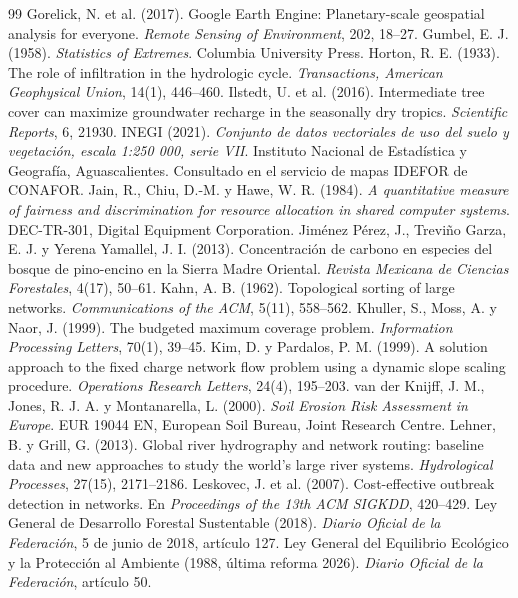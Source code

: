 \begin{thebibliography}{99}
 Gorelick, N. et al. (2017). Google Earth Engine: Planetary-scale geospatial analysis for everyone. \emph{Remote Sensing of Environment}, 202, 18–27.
 Gumbel, E. J. (1958). \emph{Statistics of Extremes}. Columbia University Press.
 Horton, R. E. (1933). The role of infiltration in the hydrologic cycle. \emph{Transactions, American Geophysical Union}, 14(1), 446–460.
 Ilstedt, U. et al. (2016). Intermediate tree cover can maximize groundwater recharge in the seasonally dry tropics. \emph{Scientific Reports}, 6, 21930.
 INEGI (2021). \emph{Conjunto de datos vectoriales de uso del suelo y vegetación, escala 1:250 000, serie VII}. Instituto Nacional de Estadística y Geografía, Aguascalientes. Consultado en el servicio de mapas IDEFOR de CONAFOR.
 Jain, R., Chiu, D.-M. y Hawe, W. R. (1984). \emph{A quantitative measure of fairness and discrimination for resource allocation in shared computer systems}. DEC-TR-301, Digital Equipment Corporation.
 Jiménez Pérez, J., Treviño Garza, E. J. y Yerena Yamallel, J. I. (2013). Concentración de carbono en especies del bosque de pino-encino en la Sierra Madre Oriental. \emph{Revista Mexicana de Ciencias Forestales}, 4(17), 50–61.
 Kahn, A. B. (1962). Topological sorting of large networks. \emph{Communications of the ACM}, 5(11), 558–562.
 Khuller, S., Moss, A. y Naor, J. (1999). The budgeted maximum coverage problem. \emph{Information Processing Letters}, 70(1), 39–45.
 Kim, D. y Pardalos, P. M. (1999). A solution approach to the fixed charge network flow problem using a dynamic slope scaling procedure. \emph{Operations Research Letters}, 24(4), 195–203.
 van der Knijff, J. M., Jones, R. J. A. y Montanarella, L. (2000). \emph{Soil Erosion Risk Assessment in Europe}. EUR 19044 EN, European Soil Bureau, Joint Research Centre.
 Lehner, B. y Grill, G. (2013). Global river hydrography and network routing: baseline data and new approaches to study the world's large river systems. \emph{Hydrological Processes}, 27(15), 2171–2186.
 Leskovec, J. et al. (2007). Cost-effective outbreak detection in networks. En \emph{Proceedings of the 13th ACM SIGKDD}, 420–429.
 Ley General de Desarrollo Forestal Sustentable (2018). \emph{Diario Oficial de la Federación}, 5 de junio de 2018, artículo 127.
 Ley General del Equilibrio Ecológico y la Protección al Ambiente (1988, última reforma 2026). \emph{Diario Oficial de la Federación}, artículo 50.

\end{thebibliography}
